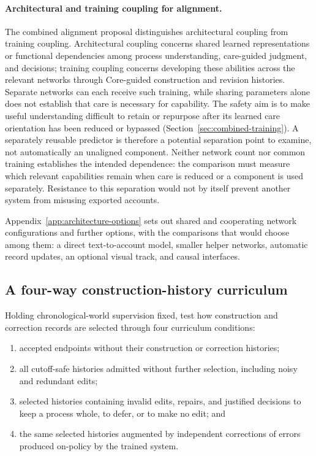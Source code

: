 \documentclass[10pt]{article}
\begin{document}
\paragraph{Architectural and training coupling for alignment.}
The combined alignment proposal distinguishes architectural coupling from
training coupling. Architectural coupling concerns shared learned
representations or functional dependencies among process understanding,
care-guided judgment, and decisions; training coupling concerns developing
these abilities across the relevant networks through Core-guided construction
and revision histories.
Separate networks can each receive such training, while sharing parameters
alone does not establish that care is necessary for capability. The safety
aim is to make useful understanding difficult to retain or repurpose after
its learned care orientation has been reduced or bypassed
(Section~\ref{sec:combined-training}). A separately reusable predictor is
therefore a potential separation point to examine, not automatically an
unaligned component. Neither network count nor common training establishes
the intended dependence: the comparison must measure which relevant
capabilities remain when care is reduced or a component is used separately.
Resistance to this separation would not by itself prevent another system from
misusing exported accounts.

Appendix~\ref{app:architecture-options} sets out shared and cooperating network
configurations and further options, with the comparisons that would choose among
them: a direct
text-to-account model, smaller helper networks, automatic record updates, an
optional visual track, and causal interfaces.

\subsection{A four-way construction-history curriculum}
\label{sec:history-curriculum}

Holding chronological-world supervision fixed, test how construction and
correction records are selected through four curriculum conditions:

\begin{enumerate}
  \item accepted endpoints without their construction or correction histories;
  \item all cutoff-safe histories admitted without further selection, including noisy and
    redundant edits;
  \item selected histories containing invalid edits, repairs, and
    justified decisions to keep a process whole, to defer, or to make no edit;
    and
  \item the same selected histories augmented by independent corrections of
    errors produced on-policy by the trained system.
\end{enumerate}
\end{document}
